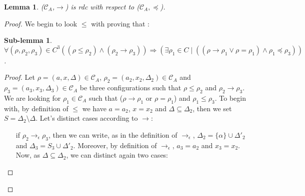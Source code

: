 \documentclass[a4paper,10pt]{report}
\newtheorem{lm}{Lemma}[thr]
\newtheorem{slm}{Sub-lemma}[lm]
\newcommand{\C}{\mathcal{C}_{A}}
\begin{document}
\begin{lm} \label{cd4}
  ($\C$,$\rightarrow$) is rdc with respect to ($\C,\preceq$).
\end{lm}




\begin{proof}
  We begin to look $\leq$ with proving that :
  \begin{slm}
  $\forall (\rho,\rho_2,\rho_3) \in C^3  ((\rho \leq \rho_2) \wedge (\rho_2 \rightarrow \rho_3)) \Rightarrow (\exists \rho_1 \in C \mid ((\rho \rightarrow \rho_1 \vee \rho = \rho_1) \wedge \rho_1 \preceq \rho_3))$.
 
  \end{slm}
   \begin{proof}
   Let $\rho = (a,x,\Delta) \in \C$, $\rho_2 = (a_2,x_2,\Delta_2) \in \C$ and $\rho_3 = (a_3,x_3,\Delta_3) \in \C$ be three configurations 
   such that $\rho \leq \rho_2$ and $\rho_2 \rightarrow \rho_3$. We are looking for $\rho_1 \in \C$ such that ($\rho \rightarrow \rho_1$ or $\rho = \rho_1$) and $\rho_1 \leq \rho_3$.
   To begin with, by definition of $\leq$ we have $a = a_2$, $x= x_2$ and $\Delta \subseteq \Delta_2$, then we set $S = \Delta_2 \setminus \Delta$. Let's distinct cases according to $\rightarrow$: 
   \begin{itemize}
    \item [if $\rho_2 \rightarrow_{\epsilon} \rho_3$,] 
    then we can write, as in the definition of $\rightarrow_{\epsilon}$,  $\Delta_2 = \{\alpha \} \cup \Delta'_2$ and $\Delta_3 = S_3 \cup \Delta'_2 $.
    Moreover, by definition of $\rightarrow_{\epsilon}$, $a_3 = a_2$ and $x_3 = x_2$.
    Now, as $\Delta \subseteq \Delta_2$, we can distinct again two cases:


\end{itemize}
\end{proof}
\end{proof}
\end{document}
